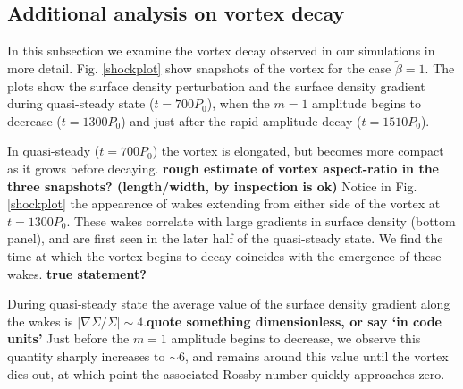 \subsection{Additional analysis on vortex decay}
In this subsection we examine the vortex decay observed in our
simulations in more detail. Fig. \ref{shockplot} show snapshots
of the vortex for the case $\tilde{\beta}=1$. The plots show the surface
density perturbation and the surface density gradient during
quasi-steady state ($t=700P_0$), when the $m=1$ amplitude begins to
decrease ($t=1300P_0$) and just after the rapid amplitude decay
($t=1510P_0$). 

In quasi-steady ($t=700P_0$) the vortex is elongated, but becomes
more compact as it grows before decaying. 
{\bf rough estimate of
  vortex aspect-ratio in the three snapshots? 
  (length/width, by inspection is ok)}  
Notice in Fig. \ref{shockplot} the appearence of wakes extending from
either side of the vortex at $t=1300P_0$. These 
wakes correlate with large gradients in surface density (bottom
panel), and are first seen in the later half of the quasi-steady
state. We find the time at which 
the vortex begins to decay coincides with the emergence of these
wakes. {\bf true statement?}  

During quasi-steady state the average value of the surface density gradient
along the wakes is $|\nabla\Sigma/\Sigma| \sim 4 $.{\bf quote something
  dimensionless, or say `in code units'}  
Just before the $m=1$ amplitude begins to decrease, we observe this quantity
sharply increases to $ \sim 6 $, and remains around this value
until the vortex dies out, at which point the associated Rossby number
quickly approaches zero.   

